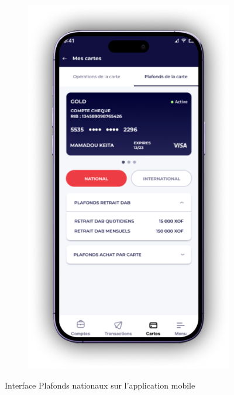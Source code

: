 \begin{figure}[!ht]
\begin{subfigure}[b]{0.49\textwidth}
        \includegraphics[width=\textwidth]{images/screens/mobileApp/device/Cards Limits Details D.png}
    \end{subfigure}
       \caption{Interface Plafonds nationaux sur l'application mobile}
\end{figure}

\newpage

